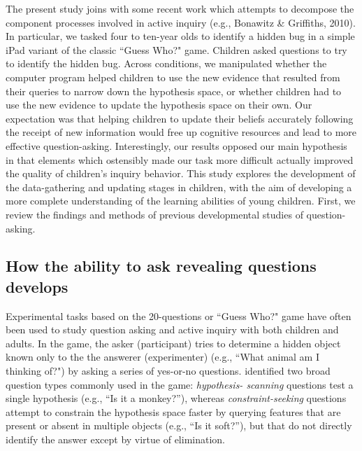 \documentclass[man,floatsintext]{apa6}
\begin{document}
\nocite{Bonawitz:2010pb}
The present study joins with some recent work which attempts to decompose the 
component processes involved in active inquiry (e.g., Bonawitz \& Griffiths, 2010).  
In particular, we tasked four to ten-year olds to identify a hidden bug in
a simple iPad variant of the classic ``Guess Who?" game. Children asked questions to try 
to identify the hidden bug. Across conditions, we manipulated whether the computer program 
helped children to use the new evidence that resulted from their queries to narrow down the
hypothesis space, or whether children had to use the new evidence to update the hypothesis space
on their own.  Our expectation was that helping children to update their beliefs accurately following the 
receipt of new information would free up cognitive resources and lead to more effective question-asking. 
Interestingly, our results opposed our main hypothesis in that elements which 
ostensibly made our task more difficult actually improved the quality of children's inquiry  behavior.  
This study explores the development of the data-gathering and updating stages in children, with 
the aim of developing a more complete understanding of the learning abilities of young children. First, we review the findings and methods of previous developmental studies of question-asking.

\subsection{How the ability to ask revealing questions develops}

Experimental tasks based on the 20-questions or ``Guess Who?" game have often been used to
study question asking and active inquiry with both children and adults.
In the game, the asker (participant) tries to determine a hidden object known
only to the the answerer (experimenter) (e.g., ``What animal am I thinking of?")
by asking a series of yes-or-no questions.
 identified two broad question types commonly used in the game: \emph{hypothesis-
scanning} questions test a single hypothesis (e.g., ``Is it a monkey?''), whereas 
\emph{constraint-seeking} questions attempt to constrain the hypothesis space faster by 
querying features that are present or absent in multiple objects (e.g., ``Is it soft?''), 
but that do not directly identify the answer except by virtue of elimination. 
\end{document}
